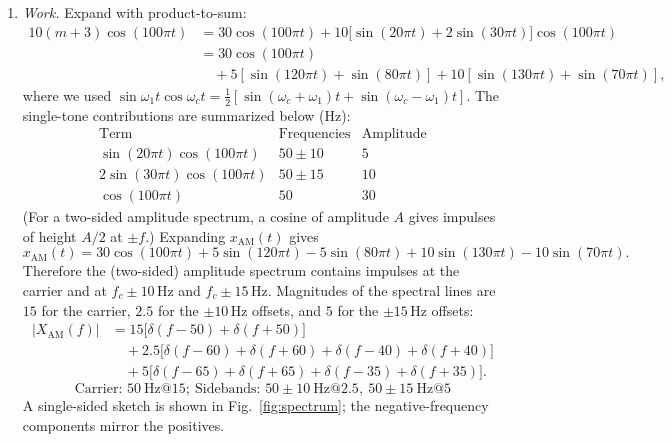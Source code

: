 \documentclass[12pt]{article}
\newcommand{\answer}[1]{\boxed{\;#1\;}}
\begin{document}
\begin{enumerate}[label=\textbf{(\alph*)}]
  \item
    \emph{Work.} Expand with product-to-sum:
    \[
    \begin{aligned}
      10(m{+}3)\cos(100\pi t)
        &= 30\cos(100\pi t) + 10\bigl[\sin(20\pi t)+2\sin(30\pi t)\bigr]\cos(100\pi t)\\
        &= 30\cos(100\pi t) \\
        &\quad + 5\!\left[\sin(120\pi t)+\sin(80\pi t)\right]
           + 10\!\left[\sin(130\pi t)+\sin(70\pi t)\right],
    \end{aligned}
    \]
    where we used \(\sin\omega_1 t\cos\omega_ct=\tfrac{1}{2}\left[\sin(\omega_c{+}\omega_1)t+\sin(\omega_c{-}\omega_1)t\right]\).
    The single-tone contributions are summarized below (Hz):
    \[
    \begin{array}{c|c|c}
      \text{Term} & \text{Frequencies} & \text{Amplitude} \\\hline
      \sin(20\pi t)\cos(100\pi t) & 50\pm 10 & 5 \\
      2\sin(30\pi t)\cos(100\pi t) & 50\pm 15 & 10 \\
      \cos(100\pi t) & 50 & 30
    \end{array}
    \]
    (For a two-sided amplitude spectrum, a cosine of amplitude \(A\) gives impulses of height \(A/2\) at \(\pm f\).)
    Expanding $x_{\text{AM}}(t)$ gives
    \[
      x_{\text{AM}}(t) = 30\cos(100\pi t)
        + 5\sin(120\pi t) - 5\sin(80\pi t)
        + 10\sin(130\pi t) - 10\sin(70\pi t).
    \]
    Therefore the (two-sided) amplitude spectrum contains impulses at the carrier and at $f_c \pm 10\,\text{Hz}$ and $f_c \pm 15\,\text{Hz}$.  Magnitudes of the spectral lines are $15$ for the carrier, $2.5$ for the $\pm 10\,\text{Hz}$ offsets, and $5$ for the $\pm 15\,\text{Hz}$ offsets:
    \[
      \begin{aligned}
        |X_{\text{AM}}(f)|
          &= 15\bigl[\delta(f-50)+\delta(f+50)\bigr] \\
          &\quad + 2.5\bigl[\delta(f-60)+\delta(f+60)+\delta(f-40)+\delta(f+40)\bigr] \\
          &\quad + 5\bigl[\delta(f-65)+\delta(f+65)+\delta(f-35)+\delta(f+35)\bigr].
      \end{aligned}
    \]
    \[
      \answer{\text{Carrier: }50~\text{Hz}@15;\ \text{Sidebands: }50\pm10~\text{Hz}@2.5,\ 50\pm15~\text{Hz}@5}
    \]
    A single-sided sketch is shown in Fig.~\ref{fig:spectrum}; the negative-frequency components mirror the positives.


\end{enumerate}
\end{document}

